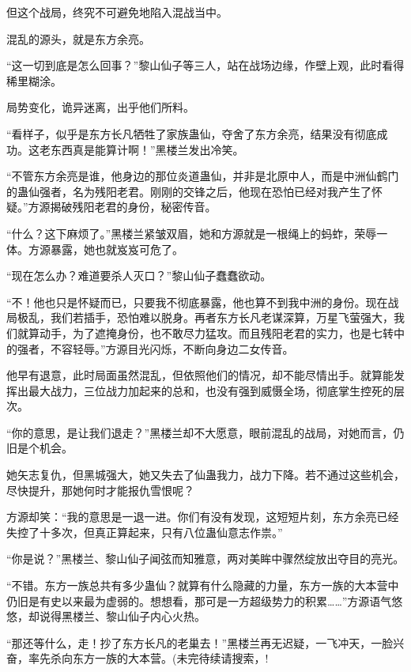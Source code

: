 \begin{this_body}
但这个战局，终究不可避免地陷入混战当中。

混乱的源头，就是东方余亮。

“这一切到底是怎么回事？”黎山仙子等三人，站在战场边缘，作壁上观，此时看得稀里糊涂。

局势变化，诡异迷离，出乎他们所料。

“看样子，似乎是东方长凡牺牲了家族蛊仙，夺舍了东方余亮，结果没有彻底成功。这老东西真是能算计啊！”黑楼兰发出冷笑。

“不管东方余亮是谁，他身边的那位炎道蛊仙，并非是北原中人，而是中洲仙鹤门的蛊仙强者，名为残阳老君。刚刚的交锋之后，他现在恐怕已经对我产生了怀疑。”方源揭破残阳老君的身份，秘密传音。

“什么？这下麻烦了。”黑楼兰紧皱双眉，她和方源就是一根绳上的蚂蚱，荣辱一体。方源暴露，她也就岌岌可危了。

“现在怎么办？难道要杀人灭口？”黎山仙子蠢蠢欲动。

“不！他也只是怀疑而已，只要我不彻底暴露，他也算不到我中洲的身份。现在战局极乱，我们若插手，恐怕难以脱身。再者东方长凡老谋深算，万星飞萤强大，我们就算动手，为了遮掩身份，也不敢尽力猛攻。而且残阳老君的实力，也是七转中的强者，不容轻辱。”方源目光闪烁，不断向身边二女传音。

他早有退意，此时局面虽然混乱，但依照他们的情况，却不能尽情出手。就算能发挥出最大战力，三位战力加起来的总和，也没有强到威慑全场，彻底掌生控死的层次。

“你的意思，是让我们退走？”黑楼兰却不大愿意，眼前混乱的战局，对她而言，仍旧是个机会。

她矢志复仇，但黑城强大，她又失去了仙蛊我力，战力下降。若不通过这些机会，尽快提升，那她何时才能报仇雪恨呢？

方源却笑：“我的意思是一退一进。你们有没有发现，这短短片刻，东方余亮已经失控了十多次，但真正算起来，只有八位蛊仙意志作祟。”

“你是说？”黑楼兰、黎山仙子闻弦而知雅意，两对美眸中骤然绽放出夺目的亮光。

“不错。东方一族总共有多少蛊仙？就算有什么隐藏的力量，东方一族的大本营中仍旧是有史以来最为虚弱的。想想看，那可是一方超级势力的积累……”方源语气悠悠，却说得黑楼兰、黎山仙子内心火热。

“那还等什么，走！抄了东方长凡的老巢去！”黑楼兰再无迟疑，一飞冲天，一脸兴奋，率先杀向东方一族的大本营。(未完待续请搜索，!

\end{this_body}

